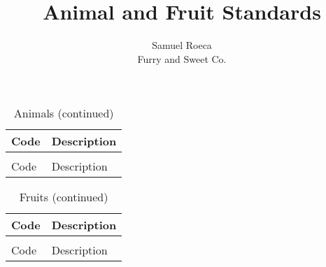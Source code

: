 \documentclass{article}
\title{Animal and Fruit Standards}
\date{}
\author{Samuel Roeca\\ Furry and Sweet Co.}
\newcommand{\customtable}[2] {
  \begin{longtable}{| l | l |}
    \caption{#1 (beginning)} \\
    \hline
    Code & Description \\
    \hline
    \endfirsthead
    \caption[]{#1 (continued)} \\
    \hline
    Code & Description \\
    \hline
    \endhead
    
    \hline
  \end{longtable}
}
\begin{document}
\maketitle
\newpage
\customtable{Animals}{./animals.tex}
\newpage
\customtable{Fruits}{./fruits.tex}
\end{document}
